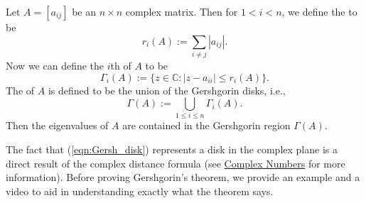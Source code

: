 \documentclass{ximera}
\begin{document}
\begin{theorem}[Gershgorin]\label{th:Gershgorin}
Let $A=[a_{ij}]$ be an $n\times n$ complex matrix.  Then for $1<i<n$, we define the  to be
$$
r_i(A):= \sum_{i \ne j} |a_{ij}|.
$$
Now we can define the $i$th  of $A$ to be
\begin{equation}\label{eqn:Gersh_disk}
\Gamma_i(A) := \{ z \in \mathbb{C} : |z-a_{ii}| \le r_i(A) \}.
\end{equation}
 The  of $A$ is defined to be the union of the Gershgorin disks, i.e.,
$$
\Gamma(A) := \bigcup_{1 \le i \le n} \Gamma_i(A).
$$
Then the eigenvalues of $A$ are contained in the Gershgorin region $\Gamma(A)$.
\end{theorem}

The fact that (\ref{eqn:Gersh_disk}) represents a disk in the complex plane is a direct result of the complex distance formula  (see \href{https://ximera.osu.edu/oerlinalg/LinearAlgebra/APX-0020/main}{Complex Numbers} for more information). Before proving Gershgorin's theorem, we provide an example and a video to aid in understanding exactly what the theorem says.

\end{document}
